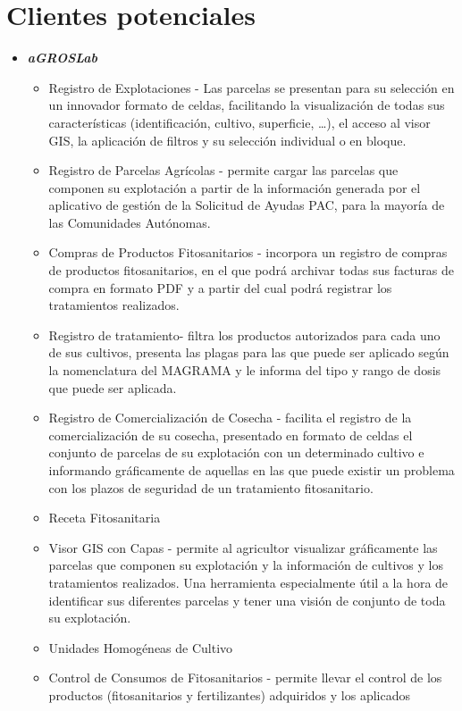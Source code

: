 \section{Clientes potenciales} \label{b.clientes.potenciales}
\begin{itemize}
\item \textbf{\textit{aGROSLab}} \cite{agroslab}
\begin{itemize}
\item Registro de Explotaciones - Las parcelas se presentan para su selección en un innovador formato de celdas, facilitando la visualización de todas sus características (identificación, cultivo, superficie, …), el acceso al visor GIS, la aplicación de filtros y su selección individual o en bloque.
\item Registro de Parcelas Agrícolas - permite cargar las parcelas que componen su explotación a partir de la información generada por el aplicativo de gestión de la Solicitud de Ayudas PAC, para la mayoría de las Comunidades Autónomas.
\item Compras de Productos Fitosanitarios - incorpora un registro de compras de productos fitosanitarios, en el que podrá archivar todas sus facturas de compra en formato PDF y a partir del cual podrá registrar los tratamientos realizados.
\item Registro de \gls{tratamiento}- filtra los productos autorizados para cada uno de sus cultivos, presenta las plagas para las que puede ser aplicado según la nomenclatura del MAGRAMA y le informa del tipo y rango de dosis que puede ser aplicada.
\item Registro de Comercialización de Cosecha - facilita el registro de la comercialización de su cosecha, presentado en formato de celdas el conjunto de parcelas de su explotación con un determinado cultivo e informando gráficamente de aquellas en las que puede existir un problema con los plazos de seguridad de un tratamiento fitosanitario.
\item Receta Fitosanitaria 
\item Visor GIS con Capas - permite al agricultor visualizar gráficamente las parcelas que componen su explotación y la información de cultivos y los tratamientos realizados. Una herramienta especialmente útil a la hora de identificar sus diferentes parcelas y tener una visión de conjunto de toda su explotación.
\item Unidades Homogéneas de Cultivo
\item Control de Consumos de Fitosanitarios - permite llevar el control de los productos (fitosanitarios y fertilizantes) adquiridos y los aplicados

\end{itemize}
\end{itemize}
